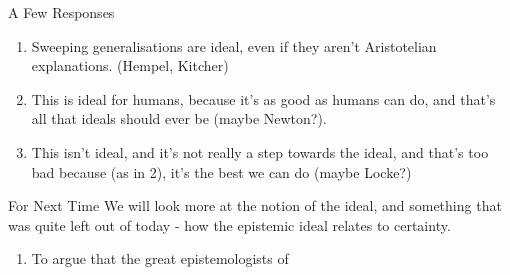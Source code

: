 \documentclass[
  17pt,
  letterpaper,
  ignorenonframetext,
  aspectratio=169,
]{beamer}
\providecommand{\tightlist}{%
  \setlength{\itemsep}{0pt}\setlength{\parskip}{0pt}}\usepackage{longtable,booktabs,array}
\begin{document}
\begin{frame}{A Few Responses}
\protect\hypertarget{a-few-responses}{}
\begin{enumerate}[<+->]
\tightlist
\item
  Sweeping generalisations are ideal, even if they aren't Aristotelian
  explanations. (Hempel, Kitcher)
\item
  This is ideal for humans, because it's as good as humans can do, and
  that's all that ideals should ever be (maybe Newton?).
\item
  This isn't ideal, and it's not really a step towards the ideal, and
  that's too bad because (as in 2), it's the best we can do (maybe
  Locke?)
\end{enumerate}
\end{frame}

\begin{frame}{For Next Time}
\protect\hypertarget{for-next-time}{}
We will look more at the notion of the ideal, and something that was
quite left out of today - how the epistemic ideal relates to certainty.

\begin{enumerate}[<+->]
\tightlist
\item
  To argue that the great epistemologists of
\end{enumerate}
\end{frame}
\end{document}
